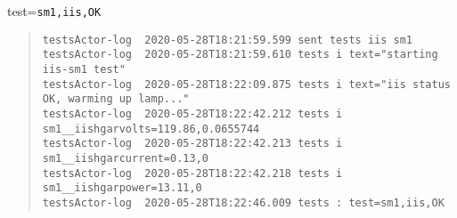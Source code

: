 test=\texttt{sm1,iis,OK}

\begin{quote}
\begin{tiny}
\begin{verbatim}
testsActor-log  2020-05-28T18:21:59.599 sent tests iis sm1
testsActor-log  2020-05-28T18:21:59.610 tests i text="starting iis-sm1 test"
testsActor-log  2020-05-28T18:22:09.875 tests i text="iis status OK, warming up lamp..."
testsActor-log  2020-05-28T18:22:42.212 tests i sm1__iishgarvolts=119.86,0.0655744
testsActor-log  2020-05-28T18:22:42.213 tests i sm1__iishgarcurrent=0.13,0
testsActor-log  2020-05-28T18:22:42.218 tests i sm1__iishgarpower=13.11,0
testsActor-log  2020-05-28T18:22:46.009 tests : test=sm1,iis,OK
\end{verbatim}
\end{tiny}
\end{quote}
